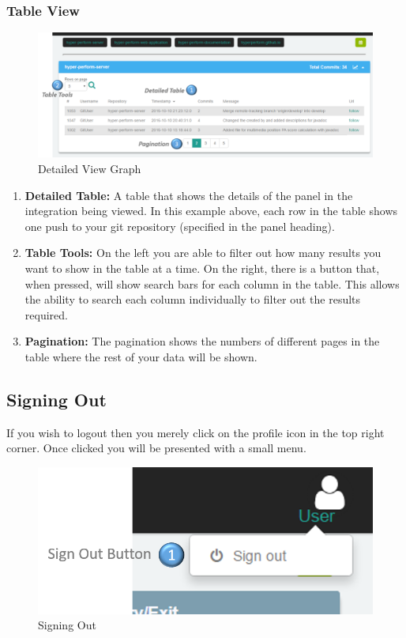 \documentclass[11pt,a4paper]{article}
\begin{document}
\subsubsection{Table View}
\begin{figure}[H]
	\begin{center}
		\includegraphics[scale=0.27]{../Images/Getting_Started/GitHub_Detailed_Table_numbered}
		\caption{Detailed View Graph}
	\end{center}
\end{figure}
\begin{enumerate}
	\item \textbf{Detailed Table:} A table that shows the details of the panel in the integration being viewed. In this example above, each row in the table shows one push to your git repository (specified in the panel heading).
	\item \textbf{Table Tools:} On the left you are able to filter out how many results you want to show in the table at a time. On the right, there is a button that, when pressed, will show search bars for each column in the table. This allows the ability to search each column individually to filter out the results required. 
	\item \textbf{Pagination:} The pagination shows the numbers of different pages in the table where the rest of your data will be shown. 
\end{enumerate}
\pagebreak
\subsection{Signing Out}
If you wish to logout then you merely click on the profile icon in the top right corner. Once clicked you will be presented with a small menu. 

\begin{figure}[H]
	\begin{center}
		\includegraphics[scale=0.7]{../Images/Getting_Started/logout_numbered}
		\caption{Signing Out}
	\end{center}
\end{figure}
\end{document}

